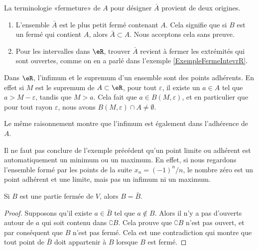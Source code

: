 \begin{example}
	La terminologie «fermeture» de $A$ pour désigner $\bar A$ provient de deux origines.
	\begin{enumerate}
		\item
			L'ensemble $\bar A$ est le plus petit fermé contenant $A$. Cela signifie que si $B$ est un fermé qui contient $A$, alors $\bar A\subset A$. Nous acceptons cela sans preuve.
		\item
			Pour les intervalles dans $\eR$, trouver $\bar A$ revient à fermer les extrémités qui sont ouvertes, comme on en a parlé dans l'exemple \ref{ExempleFermeIntevrR}.
	\end{enumerate}
\end{example}

\begin{example}
	Dans $\eR$, l'infimum et le supremum d'un ensemble sont des points adhérents. En effet si $M$ est le supremum de $A\subset\eR$, pour tout $\varepsilon$, il existe un $a\in A$ tel que $a>M-\varepsilon$, tandis que $M>a$. Cela fait que $a\in B(M,\varepsilon)$, et en particulier que pour tout rayon $\varepsilon$, nous avons $B(M,\varepsilon)\cap A\neq\emptyset$.

	Le même raisonnement montre que l'infimum est également dans l'adhérence de $A$.
\end{example}

\begin{example}		\label{ParlerEncoredeF}
	Il ne faut pas conclure de l'exemple précédent qu'un point limite ou adhérent est automatiquement un minimum ou un maximum. En effet, si nous regardons l'ensemble formé par les points de la suite $x_n=(-1)^n/n$, le nombre zéro est un point adhérent et une limite, mais pas un infimum ni un maximum.
\end{example}

\begin{lemma}
	Si $B$ est une partie fermée de $V$, alors $B=\bar B$.
\end{lemma}

\begin{proof}
	Supposons qu'il existe $a\in\bar B$ tel que $a\notin B$. Alors il n'y a pas d'ouverts autour de $a$ qui soit contenu dans $\complement B$. Cela prouve que $\complement B$ n'est pas ouvert, et par conséquent que $B$ n'est pas fermé. Cela est une contradiction qui montre que tout point de $\bar B$ doit appartenir à $B$ lorsque $B$ est fermé.
\end{proof}

